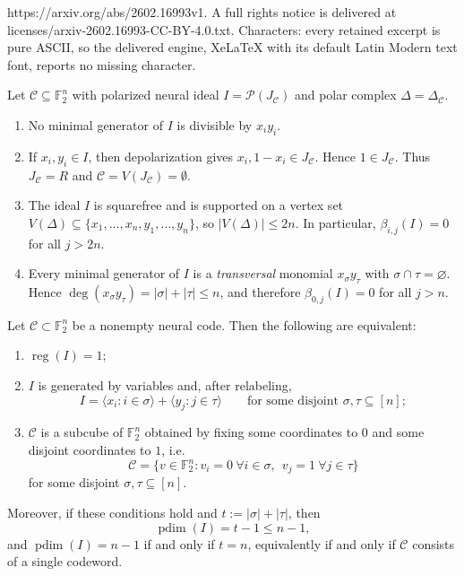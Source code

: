 \documentclass[10pt,a4paper]{amsart}
\DeclareMathOperator{\pd}{pdim}
\DeclareMathOperator{\reg}{reg}
\def\P{{\mathcal P}}
\newcommand{\C}{\mathcal{C}}
\newcommand{\F}{\mathbb{F}}
\begin{document}
https://arxiv.org/abs/2602.16993v1. A full rights notice is delivered at licenses/arxiv-2602.16993-CC-BY-4.0.txt. Characters: every retained excerpt is pure ASCII, so the delivered engine, XeLaTeX with its default Latin Modern text font, reports no missing character.
\begin{remark}\label{rem:basic_degree_bounds}
Let $\C\subseteq\F_2^n$ with polarized neural ideal $I=\P(J_\C)$ and polar complex $\Delta=\Delta_\C$.
\begin{enumerate}[label=(\alph*)]
\item No minimal generator of $I$ is divisible by $x_i y_i$.

\item If $x_i,y_i\in I$, then depolarization gives $x_i, 1-x_i\in J_\C$. Hence $1\in J_\C$.
Thus $J_\C=R$ and $\C=V(J_\C)=\emptyset$.

\item The ideal $I$ is squarefree and is supported on a vertex set
$V(\Delta)\subseteq\{x_1,\dots,x_n,y_1,\dots,y_n\}$, so $|V(\Delta)|\le 2n$.
In particular, $\beta_{i,j}(I)=0$ for all $j>2n$.

\item Every minimal generator of $I$ is a \emph{transversal} monomial $x_\sigma y_\tau$ with
$\sigma\cap\tau=\varnothing$.  Hence $\deg(x_\sigma y_\tau)=|\sigma|+|\tau|\le n$, and therefore
$\beta_{0,j}(I)=0$ for all $j>n$.
\end{enumerate}
\end{remark}

\begin{theorem}\label{thm:reg1-classification}
Let $\C\subset \F_2^n$ be a nonempty neural code.
Then the following are equivalent:
\begin{enumerate}
\item $\reg(I)=1$;
\item $I$ is generated by variables and, after relabeling,
\[
I=\langle x_i : i\in\sigma\rangle+\langle y_j : j\in\tau\rangle
\qquad\text{for some disjoint }\sigma,\tau\subseteq[n];
\]
\item $\C$ is a subcube of $\F_2^n$ obtained by fixing some coordinates to $0$ and some disjoint coordinates to $1$, i.e.
\[
\C=\{ v\in \F_2^n : v_i=0\ \forall i\in\sigma,\ \ v_j=1\ \forall j\in\tau \}
\]
for some disjoint $\sigma,\tau\subseteq[n]$.
\end{enumerate}
Moreover, if these conditions hold and $t:=|\sigma|+|\tau|$, then
\[
\pd(I)=t-1\le n-1,
\]
and $\pd(I)=n-1$ if and only if $t=n$, equivalently if and only if $\C$ consists of a single codeword.
\end{theorem}
\end{document}
